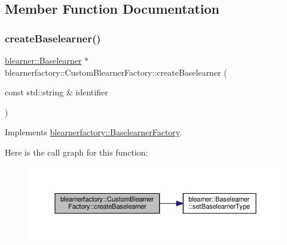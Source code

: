 \subsection{Member Function Documentation}
\mbox{\label{classblearnerfactory_1_1_custom_blearner_factory_aad915d1ac58a323d1584d27f8cdace56}} 
\subsubsection{\texorpdfstring{create\+Baselearner()}{createBaselearner()}}
{\footnotesize\ttfamily \mbox{\hyperlink{classblearner_1_1_baselearner}{blearner\+::\+Baselearner}} $\ast$ blearnerfactory\+::\+Custom\+Blearner\+Factory\+::create\+Baselearner (\begin{DoxyParamCaption}\item[{const std\+::string \&}]{identifier }\end{DoxyParamCaption})\hspace{0.3cm}{\ttfamily [virtual]}}



Implements \mbox{\hyperlink{classblearnerfactory_1_1_baselearner_factory_ac3584a20a84834099a15908690b837bb}{blearnerfactory\+::\+Baselearner\+Factory}}.

Here is the call graph for this function\+:\nopagebreak
\begin{figure}[H]
\begin{center}
\leavevmode
\includegraphics[width=350pt]{classblearnerfactory_1_1_custom_blearner_factory_aad915d1ac58a323d1584d27f8cdace56_cgraph}
\end{center}
\end{figure}
\mbox{\label{classblearnerfactory_1_1_custom_blearner_factory_a53db4c5d9eb3875241bb47a8d73744e2}} 

